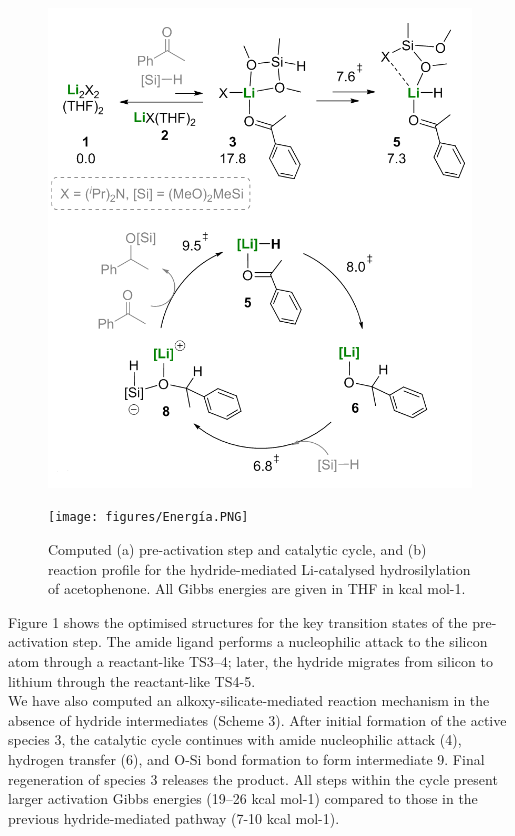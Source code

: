 \documentclass[journal=jacsat,manuscript=article]{achemso}
\begin{document}
	\begin{center}
	\begin{minipage}{0.6\textwidth} 
		\begin{figure}[H]
			\includegraphics[width=\textwidth]{figures/Ciclo.PNG}
			\end{figure}
	\end{minipage}

	\begin{minipage}{0.6\textwidth} 
		\begin{figure}[H]
			\texttt{[image: figures/Energía.PNG]}
			\caption{\label{Figure 1} Computed (a) pre-activation step and catalytic cycle, and (b) reaction profile for the hydride-mediated Li-catalysed hydrosilylation of acetophenone. All Gibbs energies are given in THF in kcal mol-1.}
		\end{figure}
	\end{minipage}
	\end{center}
	
	Figure 1 shows the optimised structures for the key transition states of the pre-activation step. The amide ligand performs a nucleophilic attack to the silicon atom through a reactant-like TS3–4; later, the hydride migrates from silicon to lithium	through the reactant-like TS4-5.
	\\
	We have also computed an alkoxy-silicate-mediated reaction mechanism in the absence of hydride intermediates (Scheme 3). After initial formation of the active species 3, the catalytic cycle continues with amide nucleophilic attack (4), hydrogen transfer (6), and O-Si bond formation to form intermediate 9. Final regeneration of species 3 releases the product. All steps within the cycle present larger activation Gibbs energies	(19–26 kcal mol-1) compared to those in the previous hydride-mediated pathway (7-10 kcal mol-1).
	
\end{document}
